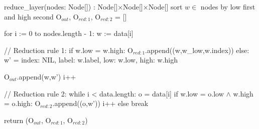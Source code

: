 \begin{blstlisting}
  reduce_layer(nodes: Node[]) : Node[]$\times$Node[]$\times$Node[]
    sort $w \in $ nodes by low first and high second
    O$_{\mathit{out}}$, O$_{\mathit{red:}1}$, O$_{\mathit{red:}2}$ = []

    for i := 0 to nodes.length - 1:
      w := data[i]

      // Reduction rule 1:
      if w.low = w.high:
        O$_{\mathit{red:}1}$.append((w,w_low,w.index))
      else:
        w' = {
          index: NIL,
          label: w.label,
          low: w.low,
          high: w.high
        }

        O$_{\mathit{out}}$.append(w,w')
        i++

        // Reduction rule 2:
        while i < data.length:
          o = data[i]
          if w.low = o.low $\land$ w.high = o.high:
            O$_{\mathit{red:}2}$.append((o,w'))
            i++
          else break

    return (O$_{\mathit{out}}$, O$_{\mathit{red:}1}$, O$_{\mathit{red:}2}$)
\end{blstlisting}
